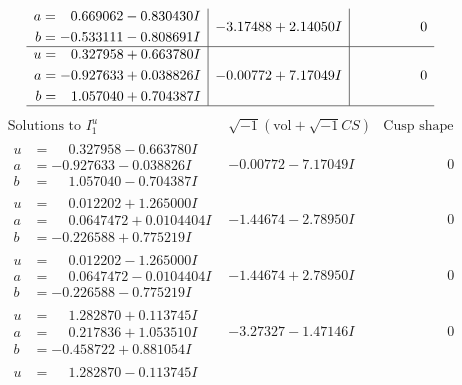 \documentclass[1p]{elsarticle_modified}
\theoremstyle{definition}
\newcommand{\I}{\sqrt{-1}}
\begin{document}
$$\begin{array}{c|c|c}
\begin{aligned}
a &= \phantom{-}0.669062 - 0.830430 I \\
b &= -0.533111 - 0.808691 I\end{aligned}
 & -3.17488 + 2.14050 I & \phantom{-0.000000 } 0 \\ \hline\begin{aligned}
u &= \phantom{-}0.327958 + 0.663780 I \\
a &= -0.927633 + 0.038826 I \\
b &= \phantom{-}1.057040 + 0.704387 I\end{aligned}
 & -0.00772 + 7.17049 I & \phantom{-0.000000 } 0\\
 \hline 
 \end{array}$$\newpage$$\begin{array}{c|c|c}  
\text{Solutions to }I^u_{1}& \I (\text{vol} + \sqrt{-1}CS) & \text{Cusp shape}\\
 \hline 
\begin{aligned}
u &= \phantom{-}0.327958 - 0.663780 I \\
a &= -0.927633 - 0.038826 I \\
b &= \phantom{-}1.057040 - 0.704387 I\end{aligned}
 & -0.00772 - 7.17049 I & \phantom{-0.000000 } 0 \\ \hline\begin{aligned}
u &= \phantom{-}0.012202 + 1.265000 I \\
a &= \phantom{-}0.0647472 + 0.0104404 I \\
b &= -0.226588 + 0.775219 I\end{aligned}
 & -1.44674 - 2.78950 I & \phantom{-0.000000 } 0 \\ \hline\begin{aligned}
u &= \phantom{-}0.012202 - 1.265000 I \\
a &= \phantom{-}0.0647472 - 0.0104404 I \\
b &= -0.226588 - 0.775219 I\end{aligned}
 & -1.44674 + 2.78950 I & \phantom{-0.000000 } 0 \\ \hline\begin{aligned}
u &= \phantom{-}1.282870 + 0.113745 I \\
a &= \phantom{-}0.217836 + 1.053510 I \\
b &= -0.458722 + 0.881054 I\end{aligned}
 & -3.27327 - 1.47146 I & \phantom{-0.000000 } 0 \\ \hline\begin{aligned}
u &= \phantom{-}1.282870 - 0.113745 I \\

\end{aligned}
\end{array}$$
\end{document}
